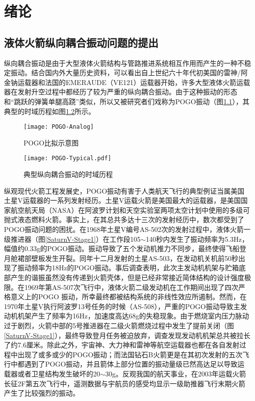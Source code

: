 \chapter{绪论}
\section{液体火箭纵向耦合振动问题的提出}
纵向耦合振动是由于大型液体火箭结构与管路推进系统相互作用而产生的一种不稳定振动\cite{Rubin:1966, Rubin:1970, Rubin:1973}。结合国内外大量历史资料，可以看出自上世纪六十年代初美国的雷神/阿金钠运载器\cite{Leadbetter:1965, Rubin:1966}和法国的EMERAUDE（VE121）\cite{Dordain:1974}运载器开始，许多大型液体火箭运载器在发射升空过程中都经历了较为严重的纵向耦合振动。由于这种振动的形态和“跳跃的弹簧单腿高跷”类似，所以又被研究者们戏称为POGO振动\cite{Rasumoff:1973}（图\ref{POGO-Analog}），其典型的时域历程如图\ref{Typical:POGO}所示。

\begin{figure}[hb]
  \centering
  \texttt{[image: POGO-Analog]}
  \caption{POGO比拟示意图}\label{POGO-Analog}
\end{figure}

\begin{figure}[th]
  \centering
  \texttt{[image: POGO-Typical.pdf]}
  \caption{典型纵向耦合振动的时域历程}\label{Typical:POGO}
\end{figure}

纵观现代火箭工程发展史，POGO振动有害于人类航天飞行的典型例证当属美国土星V运载器的一系列发射经历\cite{Hill:1969, Rich:1969, Jarvinen:1970}。土星V运载火箭是美国最大的运载器，是美国国家航空航天局（NASA）在阿波罗计划和天空实验室两项太空计划中使用的多级可抛式液态燃料火箭。事实上，在其总共多达十三次的发射经历中，数次都受到了POGO振动问题的困扰\cite{Larsen:2008}。在1968年土星V编号AS-502次的发射过程中，液体火箭一级推进器（图\ref{SaturnV-Stage1}）在工作段105$\sim$140秒内发生了振动频率为5.3Hz，幅值约0.33g的POGO振动。振动导致了五个发动机推力不同步，最终使得飞船登月舱裙部壁板发生开裂。同年十二月发射的土星AS-503，在发动机关机前50秒出现了振动频率为18Hz的POGO振动。事后调查表明，此次主发动机机架与贮箱底部产生的谐振虽然没有传递到火箭壳体，但是已经非常接近简体结构的设计强度极限。在1969年第AS-507次飞行中，液体火箭二级发动机在工作期间出现了四次严格意义上的POGO 振动，所幸最终都被结构系统的非线性效应所遏制。然而，在1970年土星V执行阿波罗13号任务的时候（AS-508），严重的POGO振动导致主发动机机架产生了频率为16Hz，加速度高达68g的失稳现象。由于燃烧室内压力脉动过于剧烈，火箭中部的5号推进器在二级火箭燃烧过程中发生了提前关闭（图\ref{SaturnV-Stage1}），最终导致登月任务被迫放弃，调查发现发动机机架总共被拉长了约7.6厘米。除此之外，宇宙神、大力神和雷神等航空运载器也都在各自发射过程中出现了或多或少的POGO振动\cite{Walker:1964, Wagner:1970, Oppenheim:1993}；而法国钻石B火箭更是在其初次发射的五次飞行中都遇到了POGO振动，并且箭体上部分位置的振动量级已然高达足以导致运载器或者卫星结构发生破坏的20$\sim$30g\cite{Dordain:1974}。反观我国的航天事业，在2003年运载火箭长征2F第五次飞行中，遥测数据与宇航员的感受均显示一级助推器飞行末期火箭产生了比较强烈的振动\cite{Ma-Daoyuan:2010, Rong-Kelin:2011}。

